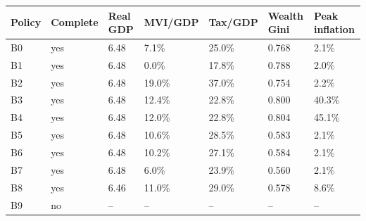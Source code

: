 \begin{tabular}{lllllll}
\toprule
Policy & Complete & Real GDP & MVI/GDP & Tax/GDP & Wealth Gini & Peak inflation \\
\midrule
B0 & yes & 6.48 & 7.1\% & 25.0\% & 0.768 & 2.1\% \\
B1 & yes & 6.48 & 0.0\% & 17.8\% & 0.788 & 2.0\% \\
B2 & yes & 6.48 & 19.0\% & 37.0\% & 0.754 & 2.2\% \\
B3 & yes & 6.48 & 12.4\% & 22.8\% & 0.800 & 40.3\% \\
B4 & yes & 6.48 & 12.0\% & 22.8\% & 0.804 & 45.1\% \\
B5 & yes & 6.48 & 10.6\% & 28.5\% & 0.583 & 2.1\% \\
B6 & yes & 6.48 & 10.2\% & 27.1\% & 0.584 & 2.1\% \\
B7 & yes & 6.48 & 6.0\% & 23.9\% & 0.560 & 2.1\% \\
B8 & yes & 6.46 & 11.0\% & 29.0\% & 0.578 & 8.6\% \\
B9 & no & -- & -- & -- & -- & -- \\
\bottomrule
\end{tabular}
